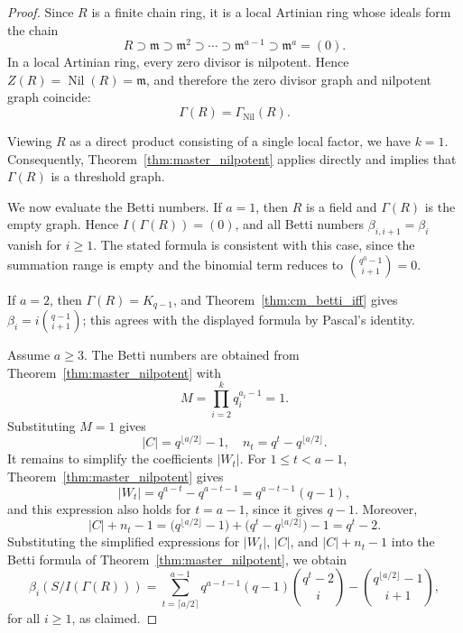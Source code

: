 \documentclass[12pt, reqno]{amsart}
\theoremstyle{definition}
\numberwithin{equation}{section}
\begin{document}
	\begin{proof}
		Since $R$ is a finite chain ring, it is a local Artinian ring whose ideals form the chain
		\[
		R \supset \mathfrak m \supset \mathfrak m^2 \supset \cdots \supset \mathfrak m^{a-1} \supset \mathfrak m^a=(0).
		\]
		In a local Artinian ring, every zero divisor is nilpotent. Hence $Z(R)=\operatorname{Nil}(R)=\mathfrak m$, and therefore the zero divisor graph and nilpotent graph coincide:
		\[
		\Gamma(R)=\Gamma_{\operatorname{Nil}}(R).
		\]
		
		Viewing $R$ as a direct product consisting of a single local factor, we have $k=1$. Consequently, Theorem~\ref{thm:master_nilpotent} applies directly and implies that $\Gamma(R)$ is a threshold graph.
		
		We now evaluate the Betti numbers. If $a=1$, then $R$ is a field and $\Gamma(R)$ is the empty graph. Hence $I(\Gamma(R))=(0)$, and all Betti numbers $\beta_{i,i+1}=\beta_i$ vanish for $i \ge 1$. The stated formula is consistent with this case, since the summation range is empty and the binomial term reduces to $\binom{q^0-1}{i+1} = 0$.
		
		If $a=2$, then $\Gamma(R)=K_{q-1}$, and Theorem~\ref{thm:cm_betti_iff} gives $\beta_i=i\binom{q-1}{i+1}$; this agrees with the displayed formula by Pascal's identity.

		Assume $a\ge3$.  The Betti numbers are obtained from Theorem~\ref{thm:master_nilpotent} with
		\[
		M=\prod_{i=2}^{k}q_i^{a_i-1}=1.
		\]
		Substituting $M=1$ gives
		\[
		|C|=q^{\lfloor a/2\rfloor}-1,\quad n_t=q^t-q^{\lfloor a/2\rfloor}.
		\]
		It remains to simplify the coefficients $|W_t|$. For $1\le t<a-1$, Theorem~\ref{thm:master_nilpotent} gives
		\[
		|W_t| = q^{a-t}-q^{a-t-1} = q^{a-t-1}(q-1),
		\]
		and this expression also holds for $t=a-1$, since it gives $q-1$. Moreover,
		\[
		|C|+n_t-1 = \bigl(q^{\lfloor a/2\rfloor}-1\bigr) + \bigl(q^t-q^{\lfloor a/2\rfloor}\bigr) -1 = q^t-2.
		\]
		Substituting the simplified expressions for $|W_t|$, $|C|$, and $|C|+n_t-1$ into the Betti formula of Theorem~\ref{thm:master_nilpotent}, we obtain
		\[
		\beta_i\!\left(S/I(\Gamma(R))\right)
		=
		\sum_{t=\lceil a/2\rceil}^{a-1}
		q^{a-t-1}(q-1)\binom{q^t-2}{i}
		-
		\binom{q^{\lfloor a/2\rfloor}-1}{i+1},
		\]
		for all $i\ge 1$, as claimed.
	\end{proof}
	
\end{document}
